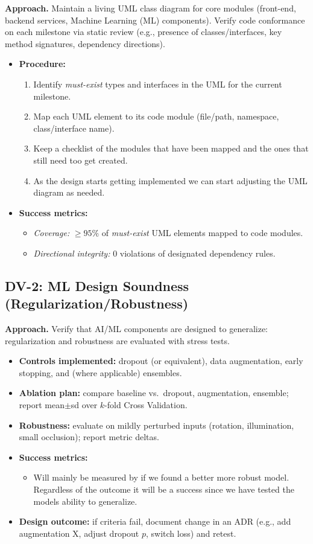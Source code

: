 \documentclass[12pt, titlepage]{article}
\begin{document}
\textbf{Approach.} Maintain a living UML class diagram for core modules (front-end, backend services, Machine Learning (ML) components).
Verify code conformance on each milestone via static review (e.g., presence of classes/interfaces,
key method signatures, dependency directions).
\begin{itemize}
  \item \textbf{Procedure:}
  \begin{enumerate}
    \item Identify \emph{must-exist} types and interfaces in the UML for the current milestone.
    \item Map each UML element to its code module (file/path, namespace, class/interface name).
    \item Keep a checklist of the modules that have been mapped and the ones that still need too get created.
    \item As the design starts getting implemented we can start adjusting the UML diagram as needed.
  \end{enumerate}
  \item \textbf{Success metrics:}
  \begin{itemize}
    \item \emph{Coverage:} $\geq 95\%$ of \emph{must-exist} UML elements mapped to code modules.
    \item \emph{Directional integrity:} $0$ violations of designated dependency rules.
  \end{itemize}
\end{itemize}


\subsection*{DV-2: ML Design Soundness (Regularization/Robustness)}
\textbf{Approach.} Verify that AI/ML components are designed to generalize: regularization and robustness are evaluated with
stress tests.
\begin{itemize}
  \item \textbf{Controls implemented:} dropout (or equivalent), data augmentation, early stopping, and (where applicable) ensembles.
  \item \textbf{Ablation plan:} compare baseline vs.\ dropout, augmentation, ensemble; report mean$\pm$sd over $k$-fold Cross Validation.
  \item \textbf{Robustness:} evaluate on mildly perturbed inputs (rotation, illumination, small occlusion); report metric deltas.
  \item \textbf{Success metrics:}
    \begin{itemize}
      \item Will mainly be measured by if we found a better more robust model. Regardless of the outcome it will be a success since we have tested the models ability to generalize.
    \end{itemize}
  \item \textbf{Design outcome:} if criteria fail, document change in an ADR (e.g., add augmentation X, adjust dropout $p$, switch loss) and retest.
\end{itemize}
\end{document}
